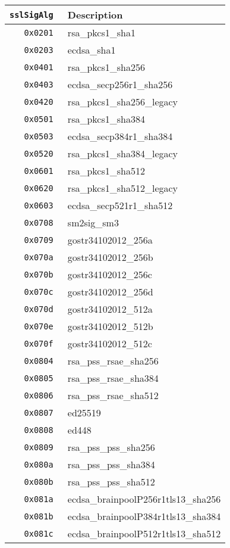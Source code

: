 \documentclass[documentation]{subfiles}
\begin{document}
\begin{minipage}{.48\textwidth}
    \begin{longtable}{>{\tt}rl}
        \toprule
        {\bf sslSigAlg} & {\bf Description}\\
        \midrule\endhead%
        0x0201 & rsa\_pkcs1\_sha1\\
        0x0203 & ecdsa\_sha1\\
        0x0401 & rsa\_pkcs1\_sha256\\
        0x0403 & ecdsa\_secp256r1\_sha256\\
        0x0420 & rsa\_pkcs1\_sha256\_legacy\\
        0x0501 & rsa\_pkcs1\_sha384\\
        0x0503 & ecdsa\_secp384r1\_sha384\\
        0x0520 & rsa\_pkcs1\_sha384\_legacy\\
        0x0601 & rsa\_pkcs1\_sha512\\
        0x0620 & rsa\_pkcs1\_sha512\_legacy\\
        0x0603 & ecdsa\_secp521r1\_sha512\\
        0x0708 & sm2sig\_sm3\\
        0x0709 & gostr34102012\_256a\\
        0x070a & gostr34102012\_256b\\
        0x070b & gostr34102012\_256c\\
        0x070c & gostr34102012\_256d\\
        0x070d & gostr34102012\_512a\\
        0x070e & gostr34102012\_512b\\
        0x070f & gostr34102012\_512c\\
        0x0804 & rsa\_pss\_rsae\_sha256\\
        0x0805 & rsa\_pss\_rsae\_sha384\\
        0x0806 & rsa\_pss\_rsae\_sha512\\
        0x0807 & ed25519\\
        0x0808 & ed448\\
        0x0809 & rsa\_pss\_pss\_sha256\\
        0x080a & rsa\_pss\_pss\_sha384\\
        0x080b & rsa\_pss\_pss\_sha512\\
        0x081a & ecdsa\_brainpoolP256r1tls13\_sha256\\
        0x081b & ecdsa\_brainpoolP384r1tls13\_sha384\\
        0x081c & ecdsa\_brainpoolP512r1tls13\_sha512\\

\end{longtable}
\end{minipage}
\end{document}
